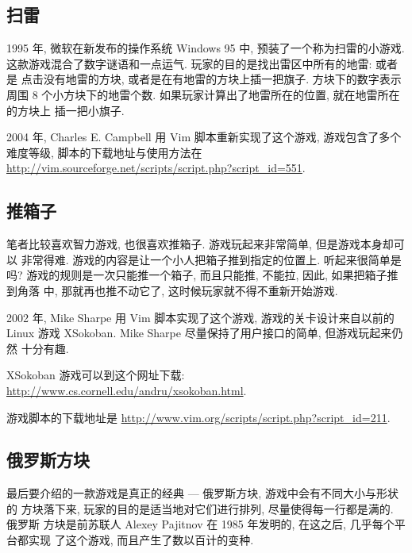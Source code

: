 \subsection{扫雷}
\label{subsec:mines}

1995 年, 微软在新发布的操作系统 Windows 95 中, 预装了一个称为扫雷的小游戏.
这款游戏混合了数字谜语和一点运气. 玩家的目的是找出雷区中所有的地雷: 或者是
点击没有地雷的方块, 或者是在有地雷的方块上插一把旗子. 方块下的数字表示周围
8 个小方块下的地雷个数. 如果玩家计算出了地雷所在的位置, 就在地雷所在的方块上
插一把小旗子.

2004 年, Charles E. Campbell 用 Vim 脚本重新实现了这个游戏, 游戏包含了多个
难度等级, 脚本的下载地址与使用方法在
\url{http://vim.sourceforge.net/scripts/script.php?script_id=551}.

\subsection{推箱子}
\label{subsec:sokoban}

笔者比较喜欢智力游戏, 也很喜欢推箱子. 游戏玩起来非常简单, 但是游戏本身却可以
非常得难. 游戏的内容是让一个小人把箱子推到指定的位置上. 听起来很简单是吗?
游戏的规则是一次只能推一个箱子, 而且只能推, 不能拉, 因此, 如果把箱子推到角落
中, 那就再也推不动它了, 这时候玩家就不得不重新开始游戏.

2002 年, Mike Sharpe 用 Vim 脚本实现了这个游戏, 游戏的关卡设计来自以前的
Linux 游戏 XSokoban. Mike Sharpe 尽量保持了用户接口的简单, 但游戏玩起来仍然
十分有趣.

\begin{warning}
    XSokoban 游戏可以到这个网址下载:
    \url{http://www.cs.cornell.edu/andru/xsokoban.html}.
\end{warning}

游戏脚本的下载地址是 \url{http://www.vim.org/scripts/script.php?script_id=211}.

\subsection{俄罗斯方块}
\label{subsec:tetris}

最后要介绍的一款游戏是真正的经典 --- 俄罗斯方块, 游戏中会有不同大小与形状的
方块落下来, 玩家的目的是适当地对它们进行排列, 尽量使得每一行都是满的. 俄罗斯
方块是前苏联人 Alexey Pajitnov 在 1985 年发明的, 在这之后, 几乎每个平台都实现
了这个游戏, 而且产生了数以百计的变种.

